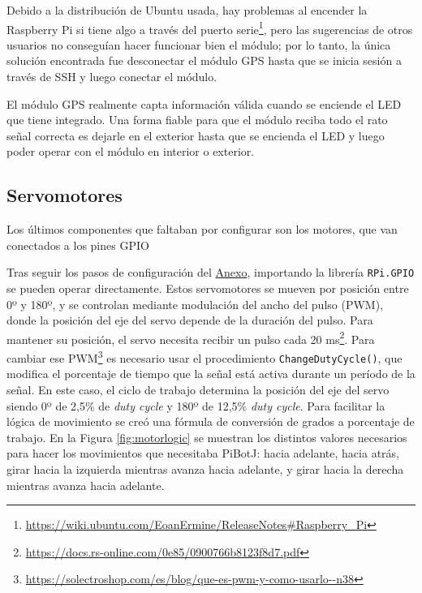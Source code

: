Debido a la distribución de Ubuntu usada, hay problemas al encender la Raspberry Pi si tiene algo a través del puerto serie\footnote{\url{https://wiki.ubuntu.com/EoanErmine/ReleaseNotes\#Raspberry_Pi}}, pero las sugerencias de otros usuarios no conseguían hacer funcionar bien el módulo; por lo tanto, la única solución encontrada fue desconectar el módulo \acs{GPS} hasta que se inicia sesión a través de SSH y luego conectar el módulo.

El módulo \acs{GPS} realmente capta información válida cuando se enciende el LED que tiene integrado. Una forma fiable para que el módulo reciba todo el rato señal correcta es dejarle en el exterior hasta que se encienda el LED y luego poder operar con el módulo en interior o exterior. 


\subsection{Servomotores}
\label{subsec:configmotores}

Los últimos componentes que faltaban por configurar son los motores, que van conectados a los pines GPIO 


Tras seguir los pasos de configuración del \hyperref[cap:capitulo9]{Anexo}, importando la librería \verb|RPi.GPIO| se pueden operar directamente. Estos servomotores se mueven por posición entre 0º y 180º, y se controlan mediante modulación del ancho del pulso (\ac{PWM}), donde la posición del eje del servo depende de la duración del pulso. Para mantener su posición, el servo necesita recibir un pulso cada 20 ms\footnote{\url{https://docs.rs-online.com/0e85/0900766b8123f8d7.pdf}}. Para cambiar ese \ac{PWM}\footnote{\url{https://solectroshop.com/es/blog/que-es-pwm-y-como-usarlo--n38}} es necesario usar el procedimiento \verb|ChangeDutyCycle()|, que modifica el porcentaje de tiempo que la señal está activa durante un período de la señal. En este caso, el ciclo de trabajo determina la posición del eje del servo siendo 0º de 2,5\% de \textit{duty cycle} y 180º de 12,5\% \textit{duty cycle}. Para facilitar la lógica de movimiento se creó una fórmula de conversión de grados a porcentaje de trabajo. En la Figura \ref{fig:motorlogic} se muestran los distintos valores necesarios para hacer los movimientos que necesitaba PiBotJ: hacia adelante, hacia atrás, girar hacia la izquierda mientras avanza hacia adelante, y girar hacia la derecha mientras avanza hacia adelante.

